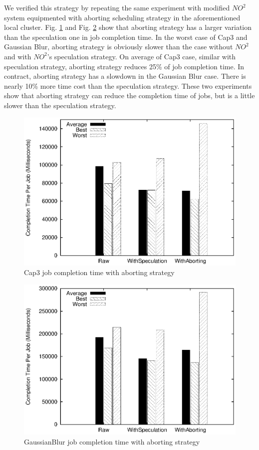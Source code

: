 We verified this strategy by repeating the same experiment with modified $NO^2$ system
equipmented with aborting scheduling strategy in the aforementioned local cluster. Fig.
\ref{figure:abort_completiontime_cap3} and Fig.
\ref{figure:abort_completiontime_gaussianblur} show that aborting strategy has a larger
variation than the speculation one in job completion time. In the worst case of Cap3 and
Gaussian Blur, aborting strategy is obviously slower than the case without $NO^2$ and with
$NO^2$'s speculation strategy. On average of Cap3 case, similar with
speculation strategy, aborting strategy reduces 25\% of job completion time. In contract, aborting
strategy has a slowdown in the Gaussian Blur case. There is nearly 10\% more time cost
than the speculation strategy. These two experiments show that aborting strategy can
reduce the completion time of jobs, but is a little slower than the speculation strategy.

\begin{figure}
\centering
\includegraphics[width=0.9\columnwidth]{figures/abort_completiontime_cap3.eps}
\caption{Cap3 job completion time with aborting strategy}
\label{figure:abort_completiontime_cap3}
\end{figure}

\begin{figure}
\centering
\includegraphics[width=0.9\columnwidth]{figures/abort_completiontime_gaussianblur.eps}
\caption{GaussianBlur job completion time with aborting strategy}
\label{figure:abort_completiontime_gaussianblur}
\end{figure}

